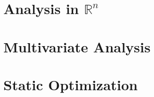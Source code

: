 \section{Analysis in $\mathbb{R}^{n}$}

\section{Multivariate Analysis}

\section{Static Optimization}

